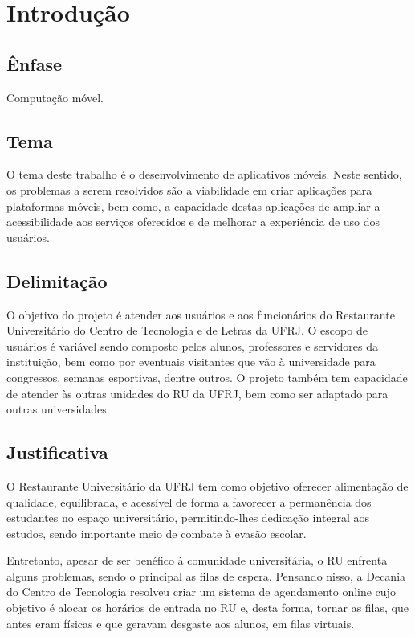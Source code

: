 \chapter{Introdução}

\vspace{0.4cm}
\section{Ênfase}

Computação móvel.

\vspace{0.4cm}
\section{Tema}

O tema deste trabalho é o desenvolvimento de aplicativos móveis. Neste sentido, os problemas a serem 
resolvidos são a viabilidade em criar aplicações para plataformas móveis, 
bem como,  a capacidade destas aplicações de ampliar a acessibilidade aos serviços 
oferecidos e de melhorar a experiência de uso dos usuários.

\vspace{0.4cm}
\section{Delimitação}

O objetivo do projeto é atender aos usuários e aos funcionários do Restaurante 
Universitário do Centro de Tecnologia e de Letras da UFRJ. O escopo de usuários é variável sendo 
composto pelos alunos, professores e servidores da instituição, bem como por eventuais visitantes que 
vão à universidade para congressos, semanas esportivas, dentre outros. O projeto também tem 
capacidade de atender às outras unidades do RU da UFRJ, bem como ser adaptado para outras 
universidades.

\vspace{0.4cm}
\section{Justificativa}

O Restaurante Universitário da UFRJ tem como objetivo oferecer alimentação de qualidade, equilibrada, e 
acessível de forma a favorecer a permanência dos estudantes no espaço universitário, permitindo-lhes 
dedicação integral aos estudos, sendo importante meio de combate à evasão escolar.

Entretanto, apesar de ser benéfico à comunidade universitária, o RU enfrenta alguns problemas, sendo o 
principal as filas de espera. Pensando nisso, a Decania do Centro de Tecnologia resolveu criar um sistema
 de agendamento online cujo objetivo é alocar os horários de entrada no RU e, desta forma, tornar as 
 filas, que antes eram físicas e que geravam desgaste aos alunos, em filas virtuais.

